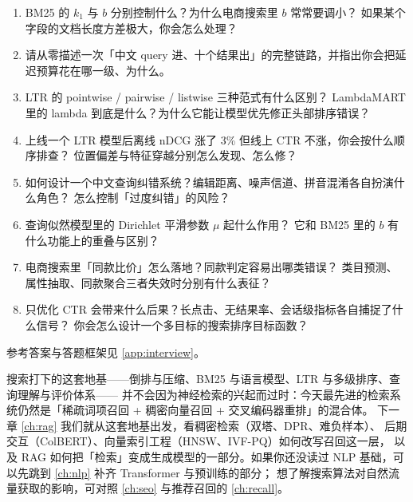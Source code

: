 \begin{interview}[本章对应的面试题]
\begin{enumerate}
  \item BM25 的 $k_1$ 与 $b$ 分别控制什么？为什么电商搜索里 $b$ 常常要调小？
        如果某个字段的文档长度方差极大，你会怎么处理？
  \item 请从零描述一次「中文 query 进、十个结果出」的完整链路，并指出你会把延迟预算花在哪一级、为什么。
  \item LTR 的 pointwise / pairwise / listwise 三种范式有什么区别？
        LambdaMART 里的 lambda 到底是什么？为什么它能让模型优先修正头部排序错误？
  \item 上线一个 LTR 模型后离线 nDCG 涨了 3\% 但线上 CTR 不涨，你会按什么顺序排查？
        位置偏差与特征穿越分别怎么发现、怎么修？
  \item 如何设计一个中文查询纠错系统？编辑距离、噪声信道、拼音混淆各自扮演什么角色？
        怎么控制「过度纠错」的风险？
  \item 查询似然模型里的 Dirichlet 平滑参数 $\mu$ 起什么作用？
        它和 BM25 里的 $b$ 有什么功能上的重叠与区别？
  \item 电商搜索里「同款比价」怎么落地？同款判定容易出哪类错误？
        类目预测、属性抽取、同款聚合三者失效时分别有什么表征？
  \item 只优化 CTR 会带来什么后果？长点击、无结果率、会话级指标各自捕捉了什么信号？
        你会怎么设计一个多目标的搜索排序目标函数？
\end{enumerate}
参考答案与答题框架见 \cref{app:interview}。
\end{interview}

搜索打下的这套地基——倒排与压缩、BM25 与语言模型、LTR 与多级排序、查询理解与评价体系——
并不会因为神经检索的兴起而过时：今天最先进的检索系统仍然是「稀疏词项召回 + 稠密向量召回 + 交叉编码器重排」的混合体。
下一章 \cref{ch:rag} 我们就从这套地基出发，看稠密检索（双塔、DPR、难负样本）、
后期交互（ColBERT）、向量索引工程（HNSW、IVF-PQ）如何改写召回这一层，
以及 RAG 如何把「检索」变成生成模型的一部分。如果你还没读过 NLP 基础，可以先跳到 \cref{ch:nlp} 补齐 Transformer 与预训练的部分；
想了解搜索算法对自然流量获取的影响，可对照 \cref{ch:seo} 与推荐召回的 \cref{ch:recall}。
